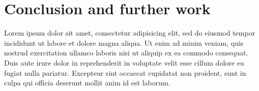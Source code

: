 \documentclass[times, utf8, seminar]{fer}
\begin{document}
\chapter{Conclusion and further work}
Lorem ipsum dolor sit amet, consectetur adipisicing elit, sed do eiusmod tempor incididunt ut labore et dolore magna aliqua. Ut enim ad minim veniam, quis nostrud exercitation ullamco laboris nisi ut aliquip ex ea commodo consequat. Duis aute irure dolor in reprehenderit in voluptate velit esse cillum dolore eu fugiat nulla pariatur. Excepteur sint occaecat cupidatat non proident, sunt in culpa qui officia deserunt mollit anim id est laborum.
% 
% 
% 
\end{document}
